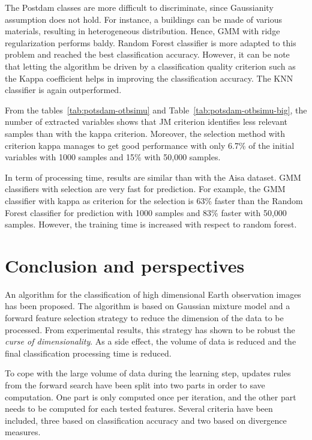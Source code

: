 \documentclass[journal]{IEEEtran}
\begin{document}
    The  Postdam classes  are  more difficult  to discriminate,  since
    Gaussianity assumption  does not  hold. For instance,  a buildings
    can  be  made of  various  materials,  resulting in  heterogeneous
    distribution.   Hence,  GMM  with  ridge  regularization  performs
    baldy. Random  Forest classifier is  more adapted to  this problem
    and reached the  best classification accuracy. However,  it can be
    note  that letting  the algorithm  be driven  by a  classification
    quality criterion such as the Kappa coefficient helps in improving
    the  classification   accuracy.  The   KNN  classifier   is  again
    outperformed.

    From        the        tables~\ref{tab:potsdam-otbsimu}        and
    Table~\ref{tab:potsdam-otbsimu-big},   the  number   of  extracted
    variables shows that JM criterion identifies less relevant samples
    than with the kappa criterion. Moreover, the selection method with
    criterion kappa manages to get good performance with only 6.7\% of
    the  initial variables  with  1000 samples  and  15\% with  50,000
    samples.

    In term of processing time, results are similar than with the Aisa
    dataset.  GMM  classifiers  with   selection  are  very  fast  for
    prediction.  For  example,  the   GMM  classifier  with  kappa  as
    criterion for the selection is  63\% faster than the Random Forest
    classifier for prediction  with 1000 samples and  83\% faster with
    50,000  samples.  However, the  training  time  is increased  with
    respect to random forest.

\section{Conclusion and perspectives}
\label{sec:conclusion}

An algorithm for the classification of high dimensional Earth observation images has been proposed. The algorithm is based on Gaussian mixture model and a forward feature selection strategy to reduce the dimension of the data to be processed. From experimental results, this strategy has shown to be robust the \emph{curse of dimensionality}. As a side effect, the volume of data is reduced and the final classification processing time is reduced. 

To cope with the large volume of data during the learning step, updates rules from the forward search have been split into two parts in order to save computation. One part is only computed once per iteration, and the other part needs to be computed for each tested features. Several criteria have been included, three based on classification accuracy and two based on divergence measures.
\end{document}

